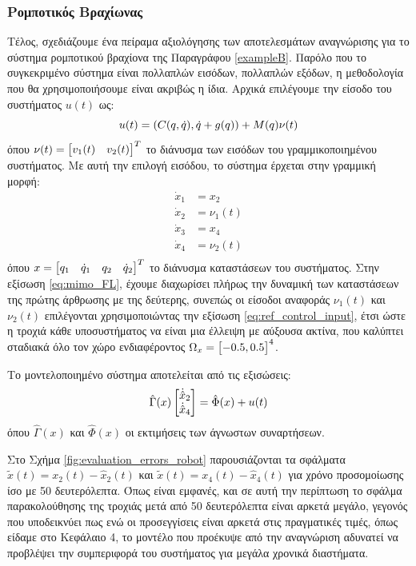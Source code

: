 \subsubsection{Ρομποτικός Βραχίωνας}
Τέλος, σχεδιάζουμε ένα πείραμα αξιολόγησης των αποτελεσμάτων αναγνώρισης για το σύστημα ρομποτικού βραχίονα της Παραγράφου \ref{exampleB}. Παρόλο που το συγκεκριμένο σύστημα είναι πολλαπλών εισόδων, πολλαπλών εξόδων, η μεθοδολογία που θα χρησιμοποιήσουμε είναι ακριβώς η ίδια. Αρχικά επιλέγουμε την είσοδο του συστήματος $u(t)$ ως:
\begin{equation}
	u(t) = \pqty{C(q,\dot q),\dot q + g(q)} + M(q)\nu(t)
\end{equation}
όπου $\nu(t) = \bmqty{v_1(t) & v_2(t)}^T$ το διάνυσμα των εισόδων του γραμμικοποιημένου συστήματος. Με αυτή την επιλογή εισόδου, το σύστημα έρχεται στην γραμμική μορφή:
\begin{equation}
	\begin{split}
	\dot{x}_1 &= x_2 \\
	\dot{x}_2 &= \nu_1(t) \\
	\dot{x}_3 &= x_4 \\
	\dot{x}_4 &= \nu_2(t) \\
	\end{split}
	\label{eq:mimo_FL}
\end{equation}
όπου $x = \bmqty{q_1 & \dot{q}_1 & q_2 & \dot{q}_2}^T$ το διάνυσμα καταστάσεων του συστήματος. Στην εξίσωση \eqref{eq:mimo_FL}, έχουμε διαχωρίσει πλήρως την δυναμική των καταστάσεων της πρώτης άρθρωσης με της δεύτερης, συνεπώς οι είσοδοι αναφοράς $\nu_1(t)$ και $\nu_2(t)$ επιλέγονται χρησιμοποιώντας την εξίσωση  \eqref{eq:ref_control_input}, έτσι ώστε η τροχιά κάθε υποσυστήματος να είναι μια έλλειψη με αύξουσα ακτίνα, που καλύπτει σταδιακά όλο τον χώρο ενδιαφέροντος $\Omega_x = \bmqty{-0.5,0.5}^4$. 

Το μοντελοποιημένο σύστημα αποτελείται από τις εξισώσεις:
\begin{equation}
	\hat{\Gamma}(x) \bmqty{\dot{\hat{x}}_2\\\dot{\hat{x}}_4} = 
	\hat{\Phi}(x) + u(t)
\end{equation}
όπου $\hat{\Gamma}(x)$ και $\hat{\Phi}(x)$ οι εκτιμήσεις των άγνωστων συναρτήσεων.

Στο Σχήμα \ref{fig:evaluation_errors_robot} παρουσιάζονται τα σφάλματα $\tilde{x}(t) = x_2(t) - \hat{x}_2(t)$ και $\tilde{x}(t) = x_4(t) - \hat{x}_4(t)$ για χρόνο προσομοίωσης ίσο με 50 δευτερόλεπτα.
Όπως είναι εμφανές, και σε αυτή την περίπτωση το σφάλμα παρακολούθησης της τροχιάς μετά από 50 δευτερόλεπτα είναι αρκετά μεγάλο, γεγονός που υποδεικνύει πως ενώ οι προσεγγίσεις είναι αρκετά στις πραγματικές τιμές, όπως είδαμε στο Κεφάλαιο 4, το μοντέλο που προέκυψε από την αναγνώριση αδυνατεί να προβλέψει την συμπεριφορά του συστήματος για μεγάλα χρονικά διαστήματα.



